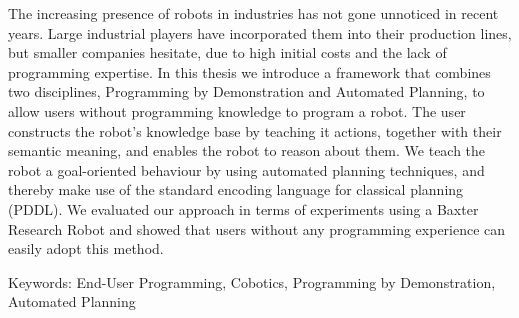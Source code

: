 \noindent The increasing presence of robots in industries has not gone unnoticed in recent years. Large industrial players have incorporated them into their production lines, but smaller companies hesitate, due to high initial costs and the lack of programming expertise. In this thesis we introduce a framework that combines two disciplines, Programming by Demonstration and Automated Planning, to allow users without programming knowledge to program a robot. 
The user constructs the robot's knowledge base by teaching it actions, together with their semantic meaning, and enables the robot to reason about them. We teach the robot a goal-oriented behaviour by using automated planning techniques, and thereby make use of the standard encoding language for classical planning (PDDL).
We evaluated our approach in terms of experiments using a Baxter Research Robot and showed that users without any programming experience can easily adopt this method.

Keywords: End-User Programming, Cobotics, Programming by Demonstration, Automated Planning
